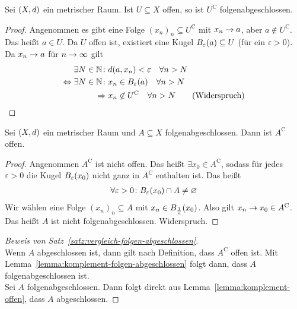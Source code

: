 \begin{lemma} %
    \label{lemma:komplement-folgen-abgeschlossen}
    Sei $\left(X, d\right)$ ein metrischer Raum. Ist $U\subseteq X$ offen, so ist $U^{\mathrm{C}}$ folgenabgeschlossen.

    \begin{proof}
        Angenommen es gibt eine Folge $(x_n)_n \subseteq U^{\mathrm{C}}$ mit $x_n\rightarrow{} a$, aber $a\not\in U^{\mathrm{C}}$. Das heißt $a\in U$. Da $U$ offen ist, existiert eine Kugel $B_{\varepsilon}\of{a} \subseteq U$ (für ein $\varepsilon > 0$). Da $x_n\rightarrow{} a$ für $n\rightarrow{}\infty$ gilt
        \begin{align*}
            \exists N\in\N\colon &d\of{a, x_n} < \varepsilon\quad\forall n> N \\
            \equivalent \exists N\in\N\colon &x_n \in B_{\varepsilon}\of{a}\quad\forall n > N\\
            \impl &x_n\not\in U^{\mathrm{C}}\quad\forall n > N\tag*{(Widerspruch)\qedhere}
        \end{align*}
    \end{proof}
\end{lemma}

\begin{lemma}
    \label{lemma:komplement-offen}
    Sei $\left(X, d\right)$ ein metrischer Raum und $A\subseteq X$ folgenabgeschlossen. Dann ist $A^{\mathrm{C}}$ offen.

    \begin{proof}
        Angenommen $A^{\mathrm{C}}$ ist nicht offen. Das heißt $\exists x_0 \in A^{\mathrm{C}}$, sodass für jedes $\varepsilon > 0$ die Kugel $B_{\varepsilon}\of{x_0}$ nicht ganz in $A^{\mathrm{C}}$ enthalten ist. Das heißt
        \begin{align*}
            \forall\varepsilon > 0\colon B_{\varepsilon}\of{x_0}\cap A \neq \emptyset
        \end{align*}
        Wir wählen eine Folge $(x_n)_n\subseteq A$ mit $x_n\in B_{\frac{1}{n}}\of{x_0}$. Also gilt $x_n\rightarrow{} x_0\in A^{\mathrm{C}}$. Das heißt $A$ ist nicht folgenabgeschlossen. Widerspruch.
    \end{proof}
\end{lemma}

\begin{proof}[Beweis von Satz~\ref{satz:vergleich-folgen-abgeschlossen}]
    ~\\
    \anf{$\impl$} Wenn $A$ abgeschlossen ist, dann gilt nach Definition, dass $A^{\mathrm{C}}$ offen ist. Mit Lemma~\ref{lemma:komplement-folgen-abgeschlossen} folgt dann, dass $A$ folgenabgeschlossen ist.\\
    \anf{$\Leftarrow$} Sei $A$ folgenabgeschlossen. Dann folgt direkt aus Lemma~\ref{lemma:komplement-offen}, dass $A$ abgeschlossen.
\end{proof}

